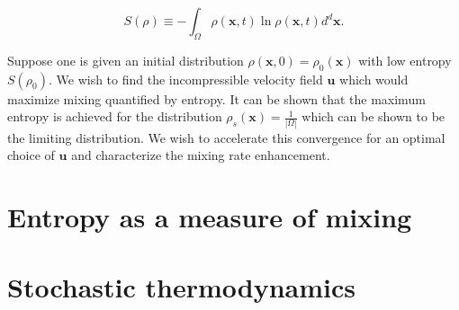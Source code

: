 \documentclass[12pt]{article}
\begin{document}
\begin{equation}
S(\rho)\equiv - \int_{\Omega} \rho (\mathbf{x},t) \ln \rho (\mathbf{x},t) d^{d}\mathbf{x}.
\end{equation}

Suppose one is given an initial distribution $\rho(\mathbf{x},0)=\rho_{0}(\mathbf{x})
$ with low entropy $S(\rho_{0})$.  We wish to find the incompressible velocity field $\mathbf{u}$ which would maximize mixing  quantified by entropy. It can be shown that the maximum entropy is achieved for the distribution $\rho_{s}(\mathbf{x})=\frac{1}{|\Omega|}$ which can be shown to be the limiting distribution. We wish to accelerate this convergence for an optimal choice of $\mathbf{u}$ and characterize the mixing rate enhancement.

\section{Entropy as a measure of mixing}



\section{Stochastic thermodynamics}
\end{document}
